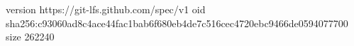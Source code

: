 version https://git-lfs.github.com/spec/v1
oid sha256:c93060ad8c4ace44fac1bab6f680eb4de7c516cec4720ebc9466de0594077700
size 262240
